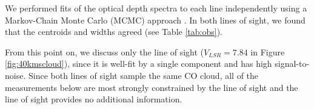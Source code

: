 
We performed fits of the optical depth spectra to each line independently using
a  Markov-Chain Monte Carlo (MCMC) approach \citep{Ginsburg2011c,Patil2010a}. In
both lines of sight, we found that the centroids and widths agreed (see Table
\ref{tab:obs}).  %

From this point on, we discuss only the \north line of sight ($V_{LSR}=7.84$
\kms in Figure \ref{fig:40kmscloud}), since it is well-fit by a single
component and has high signal-to-noise.  Since both lines of sight
sample the same CO cloud, all of the measurements below are most strongly
constrained by the \north line of sight and the \south line of sight provides
no additional information.


